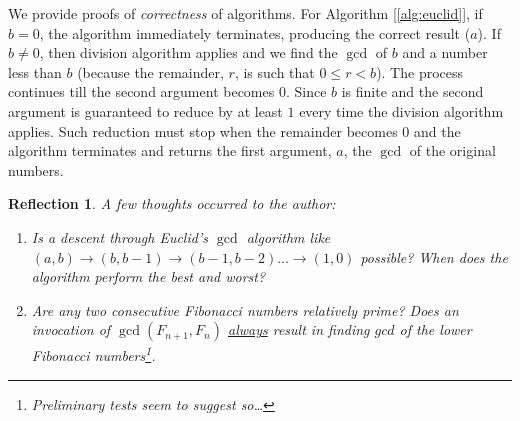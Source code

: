 \documentclass[english,notitlepage,smartquotes]{hgbreport}
\theoremstyle{definition}
\theoremstyle{remark}
\theoremstyle{plain}
\newtheorem{reflection}{Reflection}
\begin{document}
We provide proofs of \emph{correctness} of algorithms. For Algorithm [\ref{alg:euclid}], if $b=0$, the algorithm immediately terminates, producing the correct result ($a$). If $b\ne 0$, then division algorithm applies and we find the $\gcd$ of $b$ and a number less than $b$ (because the remainder, $r$, is such that $0\leq r<b$). The process continues till the second argument becomes $0$. Since $b$ is finite and the second argument is guaranteed to reduce by at least $1$ every time the division algorithm applies. Such reduction must stop when the remainder becomes $0$ and the algorithm terminates and returns the first argument, $a$, the $\gcd$ of the original numbers. 

\begin{reflection}
A few thoughts occurred to the author:
\begin{enumerate}
\item Is a \emph{descent} through Euclid's $\gcd$ algorithm like $(a,b)\rightarrow(b,b-1)\rightarrow(b-1,b-2)\dots\rightarrow(1,0)$ possible? When does the algorithm perform the best and worst?
\item Are any two consecutive Fibonacci numbers relatively prime? Does an invocation of $\gcd(F_{n+1}, F_n)$ \underline{always} result in finding $gcd$ of the lower Fibonacci numbers\footnote{\emph{Preliminary} tests seem to suggest so\dots}.
\end{enumerate}
\end{reflection}
\end{document}
